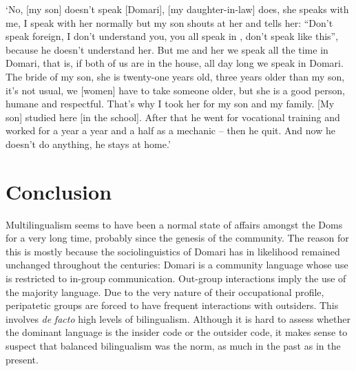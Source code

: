 \documentclass[output=paper]{langsci/langscibook}
\begin{document}
\glt ‘No, [my son] doesn’t speak [Domari], [my daughter-in-law] does, she speaks with me, I speak with her normally but my son shouts at her and tells her: “Don’t speak foreign, I don’t understand you, you all speak in , don’t speak like this”, because he doesn’t understand her. But me and her we speak all the time in Domari, that is, if both of us are in the house, all day long we speak in Domari. The bride of my son, she is twenty-one years old, three years older than my son, it’s not usual, we [women] have to take someone older, but she is a good person, humane and respectful. That’s why I took her for my son and my family. [My son] studied here [in the school]. After that he went for vocational training and worked for a year a year and a half as a mechanic -- then he quit. And now he doesn’t do anything, he stays at home.’ 
\z

\section{Conclusion}

Multilingualism seems to have been a normal state of affairs amongst the Doms for a very long time, probably since the genesis of the community. The reason for this is mostly because the sociolinguistics of Domari has in likelihood remained unchanged throughout the centuries: Domari is a community language whose use is restricted to in-group communication. Out-group interactions imply the use of the majority language. Due to the very nature of their occupational profile, peripatetic groups are forced to have frequent interactions with outsiders. This involves \textit{de} \textit{facto} high levels of {bilingualism}. Although it is hard to assess whether the dominant language is the insider code or the outsider code, it makes sense to suspect that balanced {bilingualism} was the norm, as much in the past as in the present.
\end{document}
